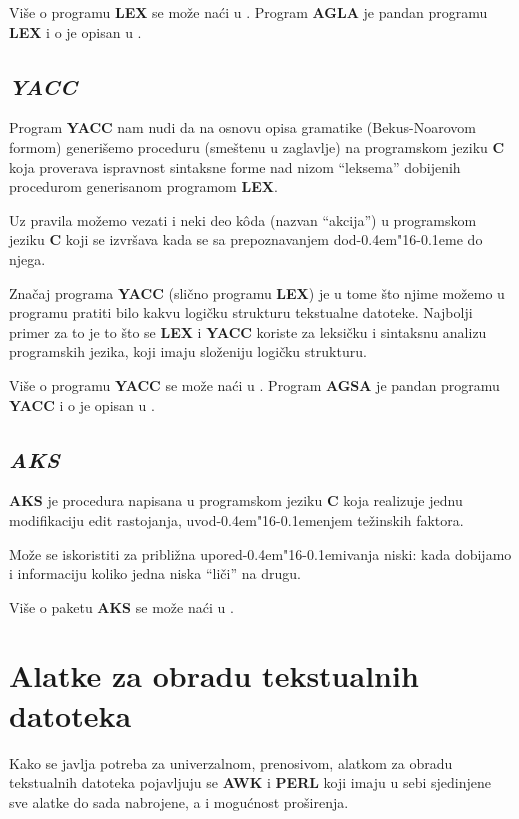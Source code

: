 \documentclass[12pt,a4paper]{article}
\def\d{d\kern-0.4em\char"16\kern-0.1em}
\begin{document}
      Vi\v se o programu {\bf LEX} se mo\v ze na\'ci u \cite{LEX}.
      Program {\bf AGLA} je pandan programu {\bf LEX} i o je opisan u
      \cite{AGJP}.
%
    \subsection{\em YACC}
      Program {\bf YACC} nam nudi da na osnovu opisa gramatike (Bekus-Noarovom
      formom) generi\v semo proceduru (sme\v stenu u zaglavlje) na programskom
      jeziku {\bf C} koja proverava ispravnost sintaksne forme nad nizom
      ``leksema'' dobijenih procedurom generisanom programom {\bf LEX}.

      Uz pravila mo\v zemo vezati i neki deo k\^oda (nazvan ``akcija'') u
      programskom jeziku {\bf C} koji se izvr\v sava kada se sa prepoznavanjem
      do\d e do njega.

      Zna\v caj programa {\bf YACC} (sli\v cno programu {\bf LEX}) je u tome
      \v sto njime mo\v zemo u programu pratiti bilo kakvu logi\v cku
      strukturu tekstualne datoteke.
      Najbolji primer za to je to \v sto se {\bf LEX} i {\bf YACC} koriste za
      leksi\v cku i sintaksnu analizu programskih jezika, koji imaju
      slo\v zeniju logi\v cku strukturu.

      Vi\v se o programu {\bf YACC} se mo\v ze na\'ci u \cite{YACC}.
      Program {\bf AGSA} je pandan programu {\bf YACC} i o je opisan u
      \cite{AGJP}.
%
    \subsection{\em AKS}
      {\bf AKS} je procedura napisana u programskom jeziku {\bf C} koja
      realizuje jednu modifikaciju edit rastojanja, uvo\d enjem te\v zinskih
      faktora.

      Mo\v ze se iskoristiti za pribli\v zna upore\d ivanja niski: kada
      dobijamo i informaciju koliko jedna niska ``li\v ci'' na drugu.

      Vi\v se o paketu {\bf AKS} se mo\v ze na\'ci u \cite{AKS}.
%
%
  \newpage
  \section{Alatke za obradu tekstualnih datoteka}
    Kako se javlja potreba za univerzalnom, prenosivom, alatkom za obradu
    tekstualnih datoteka pojavljuju se {\bf AWK} i {\bf PERL} koji imaju u
    sebi sjedinjene sve alatke do sada nabrojene, a i mogu\'cnost
    pro\v sirenja.
\end{document}

